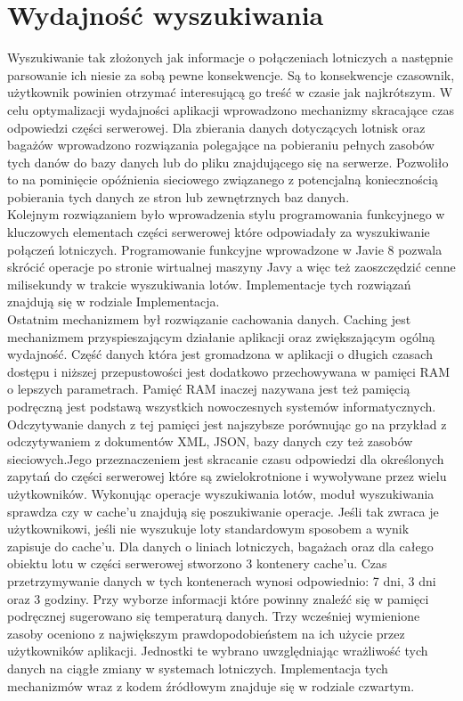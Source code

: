 \documentclass[12pt, twoside]{report}
\begin{document}
\section{Wydajność wyszukiwania}
Wyszukiwanie tak złożonych jak informacje o połączeniach lotniczych a następnie parsowanie ich niesie za sobą pewne konsekwencje. Są to konsekwencje czasownik, użytkownik powinien otrzymać interesującą go treść w czasie jak najkrótszym. W celu optymalizacji wydajności aplikacji wprowadzono mechanizmy skracające czas odpowiedzi części serwerowej.
Dla zbierania danych dotyczących lotnisk oraz bagażów wprowadzono rozwiązania polegające na pobieraniu pełnych zasobów tych danów do bazy danych lub do pliku znajdującego się na serwerze. Pozwoliło to na pominięcie opóźnienia sieciowego związanego z potencjalną koniecznością pobierania tych danych ze stron lub zewnętrznych baz danych.\\ \indent
Kolejnym rozwiązaniem było wprowadzenia stylu programowania funkcyjnego w kluczowych elementach części serwerowej które odpowiadały za wyszukiwanie połączeń lotniczych.  Programowanie funkcyjne wprowadzone w Javie 8 pozwala skrócić operacje po stronie wirtualnej maszyny Javy a więc też zaoszczędzić cenne milisekundy w trakcie wyszukiwania lotów.
Implementacje tych rozwiązań znajdują się w rodziale Implementacja.\\ \indent
Ostatnim mechanizmem był rozwiązanie cachowania danych. Caching jest mechanizmem przyspieszającym działanie aplikacji oraz zwiększającym ogólną wydajność. Część danych która jest gromadzona w aplikacji o długich czasach dostępu i niższej przepustowości jest dodatkowo przechowywana w pamięci RAM o lepszych parametrach\cite{ehcache}. Pamięć RAM inaczej nazywana jest też pamięcią podręczną jest podstawą wszystkich nowoczesnych systemów informatycznych. Odczytywanie danych z tej pamięci jest najszybsze porównując go na przykład z odczytywaniem z dokumentów XML, JSON, bazy danych czy też zasobów sieciowych.Jego przeznaczeniem jest skracanie czasu odpowiedzi dla określonych zapytań do części serwerowej które są zwielokrotnione i wywoływane przez wielu użytkowników. Wykonując operacje wyszukiwania lotów, moduł wyszukiwania sprawdza czy w cache'u znajdują się poszukiwanie operacje. Jeśli tak zwraca je użytkownikowi, jeśli nie wyszukuje loty standardowym sposobem a wynik zapisuje do cache'u. Dla danych o liniach lotniczych, bagażach oraz dla całego obiektu lotu w części serwerowej stworzono 3 kontenery cache'u. Czas przetrzymywanie danych w tych kontenerach wynosi odpowiednio: 7 dni, 3 dni oraz 3 godziny. Przy wyborze informacji które powinny znaleźć się w pamięci podręcznej sugerowano się temperaturą danych. Trzy wcześniej wymienione zasoby oceniono z największym prawdopodobieństem na ich użycie przez użytkowników aplikacji.
Jednostki te wybrano uwzględniając wrażliwość tych danych na ciągłe zmiany w systemach lotniczych. Implementacja tych mechanizmów wraz z kodem źródłowym znajduje się w rodziale czwartym.
\newpage
\end{document}

